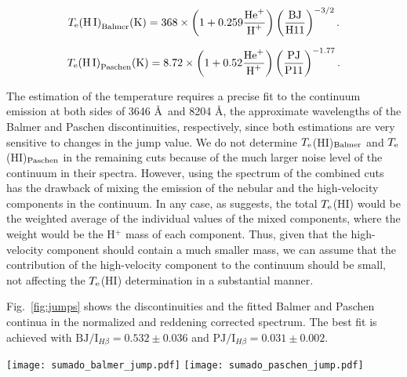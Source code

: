 \documentclass[fleqn,usenatbib]{mnras}
\begin{document}
\begin{equation}
\label{eq:balmer_fit}
T_{\rm e}{\rm (H\thinspace I)}_{\rm Balmer} ({\rm K})= 368\times\left(1+0.259\frac{\text{He}^{+}}{\text{H}^{+}}  \right)\left(\frac{\text{BJ}}{\text{H11}}\right)^{-3/2}.
\end{equation}

\begin{equation}
\label{eq:paschen_fit}
T_{\rm e}{\rm (H\thinspace I)}_{\rm Paschen} ({\rm K})=8.72\times \left(1+0.52\frac{\text{He}^{+}}{\text{H}^{+}} \right) \left( \frac{\text{PJ}}{\text{P11}}\right)^{-1.77}.
\end{equation}


The estimation of the temperature requires a precise fit to the continuum emission at both sides of 3646 \AA\ and 8204 \AA, the approximate wavelengths of the Balmer and Paschen discontinuities, respectively, since both estimations are very sensitive to changes in the jump value. We do not determine $T_{\rm e}$(H\thinspace I)$_{\rm Balmer}$ and $T_{\rm e}$(H\thinspace I)$_{\rm Paschen}$ in the remaining cuts because of the much larger noise level of the continuum in their spectra. However, using the spectrum of the combined cuts has the drawback of mixing the emission of the nebular and the high-velocity components in the continuum. In any case, as \citet{Bohigas15} suggests, the total $T_{\rm e}$(H\thinspace I) would be the weighted average of the individual values of the mixed components, where the weight would be the H$^{+}$ mass of each component. Thus, given that the high-velocity component should contain a much smaller mass, we can assume that the contribution of the high-velocity component to the continuum should be small, not affecting the $T_{\rm e}$(H\thinspace I) determination in a substantial manner.

Fig.~\ref{fig:jumps} shows the discontinuities and the fitted Balmer and Paschen continua in the normalized and reddening corrected spectrum. The best fit is achieved with $\text{BJ}/\text{I}_{H\beta} = 0.532 \pm 0.036$ and $\text{PJ}/\text{I}_{H\beta} = 0.031 \pm 0.002$.


\begin{figure*}
\texttt{[image: sumado\_balmer\_jump.pdf]}
 \texttt{[image: sumado\_paschen\_jump.pdf]}
 \caption{Reddening-corrected spectrum resulting after adding all cuts, showing the Balmer (left panel) and Paschen (right panel) discontinuities. Both jump estimations are shown in red.}
\label{fig:jumps}
\end{figure*}
\end{document}
